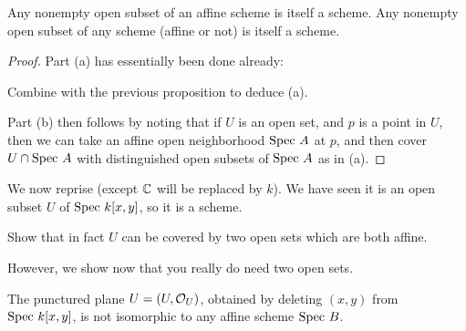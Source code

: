 \begin{corollary}
	\listhack
	\begin{enumerate}[(a)]
		\ii Any nonempty open subset of an affine scheme is itself a scheme.
		\ii Any nonempty open subset of any scheme (affine or not) is itself a scheme.
	\end{enumerate}
\end{corollary}
\begin{proof}
	Part (a) has essentially been done already:
	\begin{ques}
		Combine 
		with the previous proposition to deduce (a).
	\end{ques}
	Part (b) then follows by noting that if $U$ is an open set,
	and $p$ is a point in $U$,
	then we can take an affine open neighborhood $\text{Spec } A$ at $p$,
	and then cover $U \cap \text{Spec } A$ with distinguished
	open subsets of $\text{Spec } A$ as in (a).
\end{proof}

We now reprise 
(except $\mathbb C$ will be replaced by $k$).
We have seen it is an open subset $U$ of $\text{Spec } k[x,y]$, so it is a scheme.
\begin{ques}
	Show that in fact $U$ can be covered by
	two open sets which are both affine.
\end{ques}
However, we show now that you really do need two open sets.
\begin{proposition}
	The punctured plane $U = (U, \mathcal O_U)$,
	obtained by deleting $(x,y)$ from $\text{Spec } k[x,y]$,
	is not isomorphic to any affine scheme $\text{Spec } B$.
\end{proposition}

